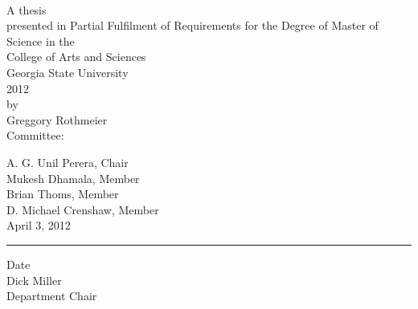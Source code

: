 \begin{doublespace}
\begin{center}
  \textsc{\thesisTitle}\\
  \vspace{0.4in}
  A thesis\\
  presented in Partial Fulfilment of Requirements for the Degree of Master of Science in the\\
  College of Arts and Sciences\\
  Georgia State University\\
  2012\\
  by\\
  Greggory Rothmeier\\
  \vspace*{\fill}
  Committee:\\
  \begin{singlespace}
    \signhere
    A. G. Unil Perera, Chair\\
    \signhere
    Mukesh Dhamala, Member\\
    \signhere
    Brian Thoms, Member\\
    \signhere
    D. Michael Crenshaw, Member \\
    \vspace{0.2in}
    April 3, 2012\\
    \rule{\linewidth}{0.5mm}
    Date\\
    \signhere
    Dick Miller\\
    Department Chair\\
    \vspace{0.1in}
  \end{singlespace}
\end{center}
\end{doublespace}